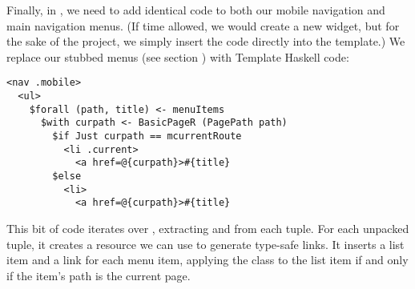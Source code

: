 Finally, in , we need to add identical code to both our mobile navigation and main navigation menus. (If time allowed, we would create a new widget, but for the sake of the project, we simply insert the code directly into the template.) We replace our stubbed menus (see section ) with Template Haskell code:

\begin{Verbatim}
<nav .mobile>
  <ul>
    $forall (path, title) <- menuItems
      $with curpath <- BasicPageR (PagePath path)
        $if Just curpath == mcurrentRoute
          <li .current>
            <a href=@{curpath}>#{title}
        $else 
          <li>
            <a href=@{curpath}>#{title}
\end{Verbatim}

This bit of code iterates over , extracting  and  from each tuple. For each unpacked tuple, it creates a  resource we can use to generate type-safe links. It inserts a list item and a link for each menu item, applying the  class to the list item if and only if the item's path is the current page.


